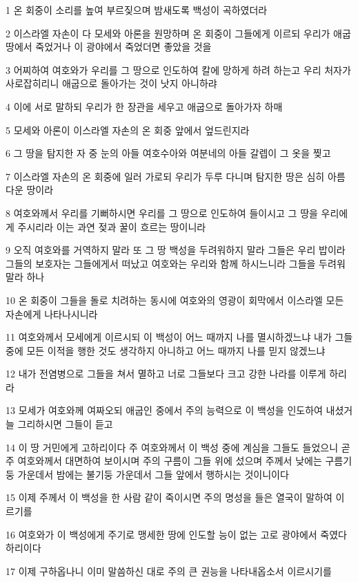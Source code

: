 \par 1 온 회중이 소리를 높여 부르짖으며 밤새도록 백성이 곡하였더라
\par 2 이스라엘 자손이 다 모세와 아론을 원망하며 온 회중이 그들에게 이르되 우리가 애굽 땅에서 죽었거나 이 광야에서 죽었더면 좋았을 것을
\par 3 어찌하여 여호와가 우리를 그 땅으로 인도하여 칼에 망하게 하려 하는고 우리 처자가 사로잡히리니 애굽으로 돌아가는 것이 낫지 아니하랴
\par 4 이에 서로 말하되 우리가 한 장관을 세우고 애굽으로 돌아가자 하매
\par 5 모세와 아론이 이스라엘 자손의 온 회중 앞에서 엎드린지라
\par 6 그 땅을 탐지한 자 중 눈의 아들 여호수아와 여분네의 아들 갈렙이 그 옷을 찢고
\par 7 이스라엘 자손의 온 회중에 일러 가로되 우리가 두루 다니며 탐지한 땅은 심히 아름다운 땅이라
\par 8 여호와께서 우리를 기뻐하시면 우리를 그 땅으로 인도하여 들이시고 그 땅을 우리에게 주시리라 이는 과연 젖과 꿀이 흐르는 땅이니라
\par 9 오직 여호와를 거역하지 말라 또 그 땅 백성을 두려워하지 말라 그들은 우리 밥이라 그들의 보호자는 그들에게서 떠났고 여호와는 우리와 함께 하시느니라 그들을 두려워 말라 하나
\par 10 온 회중이 그들을 돌로 치려하는 동시에 여호와의 영광이 회막에서 이스라엘 모든 자손에게 나타나시니라
\par 11 여호와께서 모세에게 이르시되 이 백성이 어느 때까지 나를 멸시하겠느냐 내가 그들 중에 모든 이적을 행한 것도 생각하지 아니하고 어느 때까지 나를 믿지 않겠느냐
\par 12 내가 전염병으로 그들을 쳐서 멸하고 너로 그들보다 크고 강한 나라를 이루게 하리라
\par 13 모세가 여호와께 여짜오되 애굽인 중에서 주의 능력으로 이 백성을 인도하여 내셨거늘 그리하시면 그들이 듣고
\par 14 이 땅 거민에게 고하리이다 주 여호와께서 이 백성 중에 계심을 그들도 들었으니 곧 주 여호와께서 대면하여 보이시며 주의 구름이 그들 위에 섰으며 주께서 낮에는 구름기둥 가운데서 밤에는 불기둥 가운데서 그들 앞에서 행하시는 것이니이다
\par 15 이제 주께서 이 백성을 한 사람 같이 죽이시면 주의 명성을 들은 열국이 말하여 이르기를
\par 16 여호와가 이 백성에게 주기로 맹세한 땅에 인도할 능이 없는 고로 광야에서 죽였다 하리이다
\par 17 이제 구하옵나니 이미 말씀하신 대로 주의 큰 권능을 나타내옵소서 이르시기를
